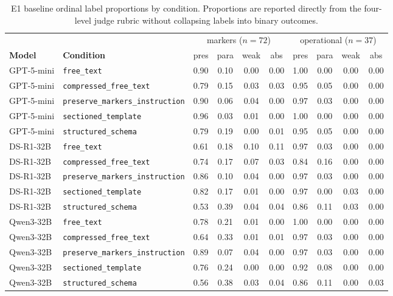 \begin{table}[!ht]
\centering
\small
\setlength{\tabcolsep}{3pt}
\begin{tabular}{@{}llcccccccc@{}}
\toprule
&& \multicolumn{4}{c}{markers ($n=72$)} & \multicolumn{4}{c}{operational ($n=37$)} \\
\cmidrule(lr){3-6}\cmidrule(l){7-10}
\textbf{Model} & \textbf{Condition} & pres & para & weak & abs & pres & para & weak & abs \\
\midrule
GPT-5-mini & \texttt{free\_text} & 0.90 & 0.10 & 0.00 & 0.00 & 1.00 & 0.00 & 0.00 & 0.00 \\
GPT-5-mini & \texttt{compressed\_free\_text} & 0.79 & 0.15 & 0.03 & 0.03 & 0.95 & 0.05 & 0.00 & 0.00 \\
GPT-5-mini & \texttt{preserve\_markers\_instruction} & 0.90 & 0.06 & 0.04 & 0.00 & 0.97 & 0.03 & 0.00 & 0.00 \\
GPT-5-mini & \texttt{sectioned\_template} & 0.96 & 0.03 & 0.01 & 0.00 & 1.00 & 0.00 & 0.00 & 0.00 \\
GPT-5-mini & \texttt{structured\_schema} & 0.79 & 0.19 & 0.00 & 0.01 & 0.95 & 0.05 & 0.00 & 0.00 \\
\addlinespace
DS-R1-32B & \texttt{free\_text} & 0.61 & 0.18 & 0.10 & 0.11 & 0.97 & 0.03 & 0.00 & 0.00 \\
DS-R1-32B & \texttt{compressed\_free\_text} & 0.74 & 0.17 & 0.07 & 0.03 & 0.84 & 0.16 & 0.00 & 0.00 \\
DS-R1-32B & \texttt{preserve\_markers\_instruction} & 0.86 & 0.10 & 0.04 & 0.00 & 0.97 & 0.03 & 0.00 & 0.00 \\
DS-R1-32B & \texttt{sectioned\_template} & 0.82 & 0.17 & 0.01 & 0.00 & 0.97 & 0.00 & 0.03 & 0.00 \\
DS-R1-32B & \texttt{structured\_schema} & 0.53 & 0.39 & 0.04 & 0.04 & 0.86 & 0.11 & 0.03 & 0.00 \\
\addlinespace
Qwen3-32B & \texttt{free\_text} & 0.78 & 0.21 & 0.01 & 0.00 & 1.00 & 0.00 & 0.00 & 0.00 \\
Qwen3-32B & \texttt{compressed\_free\_text} & 0.64 & 0.33 & 0.01 & 0.01 & 0.97 & 0.03 & 0.00 & 0.00 \\
Qwen3-32B & \texttt{preserve\_markers\_instruction} & 0.89 & 0.07 & 0.04 & 0.00 & 0.97 & 0.03 & 0.00 & 0.00 \\
Qwen3-32B & \texttt{sectioned\_template} & 0.76 & 0.24 & 0.00 & 0.00 & 0.92 & 0.08 & 0.00 & 0.00 \\
Qwen3-32B & \texttt{structured\_schema} & 0.56 & 0.38 & 0.03 & 0.04 & 0.86 & 0.11 & 0.00 & 0.03 \\
\bottomrule
\end{tabular}
\caption{E1 baseline ordinal label proportions by condition. Proportions are reported directly from the four-level judge rubric without collapsing labels into binary outcomes.}
\label{tab:ordinal_label_proportions_baseline}
\end{table}
